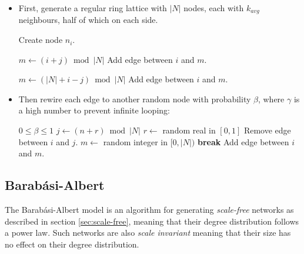\documentclass[a4paper,11pt,titlepage]{article}
\begin{document}
\begin{itemize}
  \item First, generate a regular ring lattice with $|N|$ nodes,
        each with $k_{avg}$ neighbours, half of which on each side.

  \begin{algorithmic}
      \STATE Create node $n_i$.
    \ENDFOR

        \STATE $m \gets (i + j) \bmod{|N|}$
        \STATE Add edge between $i$ and $m$.
      \ENDFOR

        \STATE $m \gets (|N| + i - j) \bmod{|N|}$
        \STATE Add edge between $i$ and $m$.
      \ENDFOR
    \ENDFOR
  \end{algorithmic}

  \item Then rewire each edge to another random node with
        probability $\beta$, where $\gamma$ is a high number
        to prevent infinite looping:


  \begin{algorithmic}
    \REQUIRE $0 \leq \beta \leq 1$
        \STATE $j \gets (n + r) \bmod{|N|}$
        \STATE $r \gets$ random real in $[0, 1]$
          \STATE Remove edge between $i$ and $j$.
            \STATE $m \gets$ random integer in $[0, |N|)$
              \STATE \textbf{break}
            \ELSE
              \STATE Add edge between $i$ and $m$.
            \ENDIF
          \ENDFOR
        \ENDIF
      \ENDFOR
    \ENDFOR
  \end{algorithmic}
\end{itemize}

\subsection{Barab\'{a}si-Albert}

The Barab\'{a}si-Albert model is an algorithm for generating \emph{scale-free}
networks as described in section \ref{sec:scale-free}, meaning that
their degree distribution follows a power law. Such networks are also
\emph{scale invariant} meaning that their size has no effect on their
degree distribution.
\end{document}
